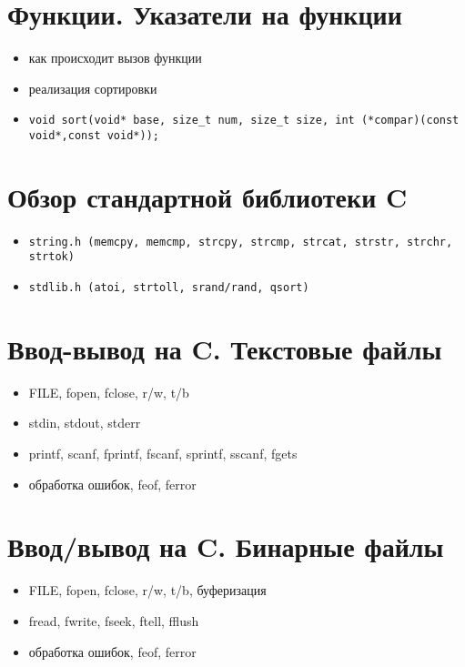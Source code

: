 \section{Функции. Указатели на функции}
\begin{itemize}[noitemsep]
    \item как происходит вызов функции
    \item реализация сортировки
    \item \begin{verbatim}void sort(void* base, size_t num, size_t size, int (*compar)(const void*,const void*));\end{verbatim}
\end{itemize}
\section{Обзор стандартной библиотеки C}
\begin{itemize}[noitemsep]
    \item \begin{verbatim}string.h (memcpy, memcmp, strcpy, strcmp, strcat, strstr, strchr, strtok)\end{verbatim}
    \item \begin{verbatim}stdlib.h (atoi, strtoll, srand/rand, qsort)\end{verbatim}
\end{itemize}
\section{Ввод-вывод на C. Текстовые файлы}
\begin{itemize}[noitemsep]
    \item FILE, fopen, fclose, r/w, t/b
    \item stdin, stdout, stderr
    \item printf, scanf, fprintf, fscanf, sprintf, sscanf, fgets
    \item обработка ошибок, feof, ferror
\end{itemize}
\section{Ввод/вывод на C. Бинарные файлы}
\begin{itemize}[noitemsep]
    \item FILE, fopen, fclose, r/w, t/b, буферизация
    \item fread, fwrite, fseek, ftell, fflush
    \item обработка ошибок, feof, ferror
\end{itemize}
